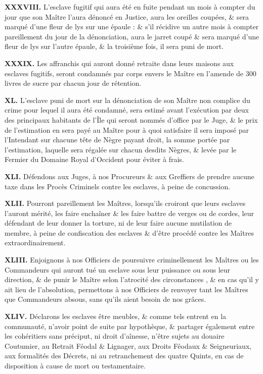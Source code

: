 \documentclass[french,twoside]{book} %
\newcommand{\labelchar}[1]{{\color{rubric}\bf #1}}
\begin{document}
\labelchar{XXXVIII.} L’esclave fugitif qui aura été en fuite pendant un mois à compter du jour que son Maître l’aura dénoncé en Justice, aura les oreilles coupées, \& sera marqué d’une fleur de lys sur une épaule : \& s’il récidive un autre mois à compter pareillement du jour de la dénonciation, aura le jarret coupé \& sera marqué d’une fleur de lys sur l’autre épaule, \& la troisième fois, il sera puni de mort.\par
\labelchar{XXXIX.} Les affranchis qui auront donné retraite dans leurs maisons aux esclaves fugitifs, seront condamnés par corps envers le Maître en l’amende de 300 livres de sucre par chacun jour de rétention.\par
\labelchar{XL.} L’esclave puni de mort sur la dénonciation de son Maître non complice du crime pour lequel il aura été condamné, sera estimé avant l’exécution par deux des principaux habitants de l’Île qui seront nommés d’office par le Juge, \& le prix de l’estimation en sera payé au Maître pour à quoi satisfaire il sera imposé par l’Intendant sur chacune tête de Nègre payant droit, la somme portée par l’estimation, laquelle sera régalée sur chacun desdits Nègres, \& levée par le Fermier du Domaine Royal d’Occident pour éviter à frais.\par
\labelchar{XLI.} Défendons aux Juges, à nos Procureurs \& aux Greffiers de prendre aucune taxe dans les Procès Criminels contre les esclaves, à peine de concussion.\par
\labelchar{XLII.} Pourront pareillement les Maîtres, lorsqu’ils croiront que leurs esclaves l’auront mérité, les faire enchaîner \& les faire battre de verges ou de cordes, leur défendant de leur donner la torture, ni de leur faire aucune mutilation de membre, à peine de confiscation des esclaves \& d’être procédé contre les Maîtres extraordinairement.\par
\labelchar{XLIII.} Enjoignons à nos Officiers de poursuivre criminellement les Maîtres ou les Commandeurs qui auront tué un esclave sous leur puissance ou sous leur direction, \& de punir le Maître selon l’atrocité des circonstances , \& en cas qu’il y ait lieu de l’absolution, permettons à nos Officiers de renvoyer tant les Maîtres que Commandeurs absous, sans qu’ils aient besoin de nos grâces.\par
\labelchar{XLIV.} Déclarons les esclaves être meubles, \& comme tels entrent en la communauté, n’avoir point de suite par hypothèque, \& partager également entre les cohéritiers sans préciput, ni droit d’aînesse, n’être sujets au douaire Coutumier, au Retrait Féodal \& Lignager, aux Droits Féodaux \& Seigneuriaux, aux formalités des Décrets, ni au retranchement des quatre Quints, en cas de disposition à cause de mort ou testamentaire.\par
\end{document}
